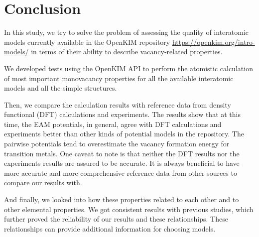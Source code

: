 \documentclass[%
 reprint,
 amsmath,amssymb,
 aps,
]{revtex4-1}
\begin{document}
\section{\label{sec:conclusion}Conclusion}

In this study, we try to solve the problem of assessing the quality of interatomic models currently available in the OpenKIM repository \url{https://openkim.org/intro-models/} in terms of their ability to describe vacancy-related properties.

We developed tests using the OpenKIM API to perform the atomistic calculation of most important monovacancy properties for all the available interatomic models and all the simple structures.

Then, we compare the calculation results with reference data from density functional (DFT) calculations and experiments.
The results show that at this time, the EAM potentials, in general, agree with DFT calculations and experiments better than other kinds of potential models in the repository.
The pairwise potentials tend to overestimate the vacancy formation energy for transition metals.
One caveat to note is that neither the DFT results nor the experiments results are assured to be accurate.
It is always beneficial to have more accurate and more comprehensive reference data from other sources to compare our results with.

And finally, we looked into how these properties related to each other and to other elemental properties.
We got consistent results with previous studies, which further proved the reliability of our results and these relationships.
These relationships can provide additional information for choosing models.
\end{document}
